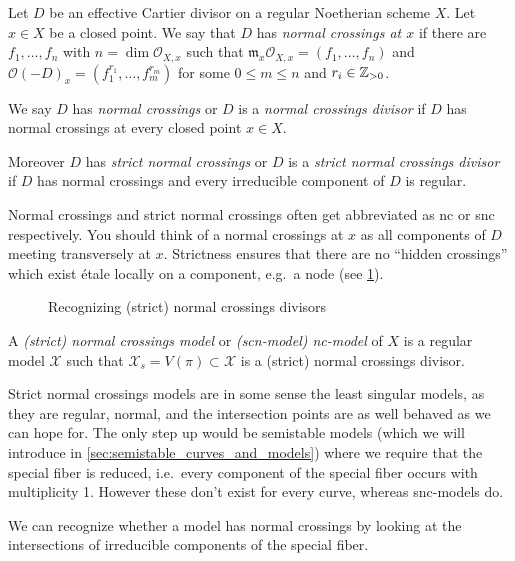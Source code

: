 \begin{definition}
	Let $D$ be an effective Cartier divisor on a regular Noetherian scheme $X$. 	Let $x \in X$ be a closed point. 
	We say that $D$ has \emph{normal crossings at $x$ } if there are $f_1, \ldots, f_n$ with $n = \dim \mathcal{O}_{X, x}$ such that $\mathfrak{m} _x \mathcal{O}_{X, x} = (f_1, \ldots, f_n)$ and $\mathcal{O}(-D)_{x} = (f_1^{r_1}, \ldots, f_m^{r_m})$ for some $0 \le m \le n$ and $r_i \in \mathbb{Z}_{> 0}$. 

	We say $D$ has \emph{normal crossings} or $D$ is a \emph{normal crossings divisor} if $D$ has normal crossings at every closed point  $x \in X$. 

	Moreover  $D$ has \emph{strict normal crossings} or $D$ is a \emph{strict normal crossings divisor} if $D$ has normal crossings and every irreducible component of $D$ is regular. 
\end{definition}
Normal crossings and strict normal crossings often get abbreviated as \gls{nc} or \gls{snc} respectively.
You should think of a normal crossings at $x$ as all components of $D$ meeting transversely at $x$. 
Strictness ensures that there are no ``hidden crossings'' which exist étale locally on a component, e.g.\ a node (see \cref{fig:normal_crossings_divisors}).

\begin{figure}[ht]
    \centering
    \caption{Recognizing (strict) normal crossings divisors}
    \label{fig:normal_crossings_divisors}
\end{figure}
\begin{definition}
	A \emph{(strict) normal crossings model} or \emph{(scn-model) nc-model}  of $X$ is a regular model $\mathscr X$ such that $\mathscr X_s = V(\pi) \subset  \mathscr X$ is a (strict) normal crossings divisor. 
\end{definition}

Strict normal crossings models are in some sense the least singular models, as they are regular, normal, and the intersection points are as well behaved as we can hope for. 
The only step up would be semistable models (which we will introduce in \cref{sec:semistable_curves_and_models}) where we require that the special fiber is reduced, i.e.\ every component of the special fiber occurs with multiplicity 1. 
However these don't exist for every curve, whereas snc-models do.

We can recognize whether a model has normal crossings by looking at the intersections of irreducible components of the special fiber. 


